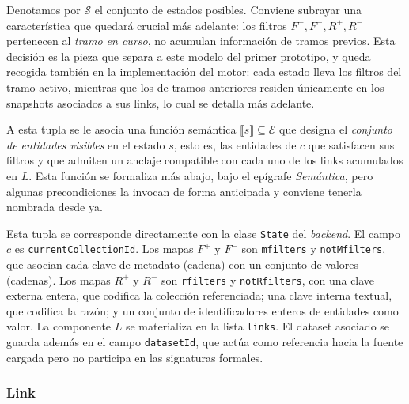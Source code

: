 Denotamos por $\mathcal{S}$ el conjunto de estados posibles. Conviene subrayar una característica que
quedará crucial más adelante: los filtros $F^{+}, F^{-}, R^{+}, R^{-}$ pertenecen al \emph{tramo en curso},
no acumulan información de tramos previos. Esta decisión es la pieza que separa a este modelo del primer
prototipo, y queda recogida también en la implementación del motor: cada estado lleva los filtros del tramo
activo, mientras que los de tramos anteriores residen únicamente en los snapshots asociados a sus links,
lo cual se detalla más adelante.

A esta tupla se le asocia una función semántica $\llbracket s \rrbracket \subseteq \mathcal{E}$ que designa el
\emph{conjunto de entidades visibles} en el estado $s$, esto es, las entidades de $c$ que satisfacen sus
filtros y que admiten un anclaje compatible con cada uno de los links acumulados en $L$. Esta función se
formaliza más abajo, bajo el epígrafe \emph{Semántica}, pero algunas precondiciones la invocan de forma
anticipada y conviene tenerla nombrada desde ya.

Esta tupla se corresponde directamente con la clase \texttt{State} del \textit{backend}. El campo $c$ es
\texttt{currentCollectionId}. Los mapas $F^{+}$ y $F^{-}$ son \texttt{mfilters} y \texttt{notMfilters},
que asocian cada clave de metadato (cadena) con un conjunto de valores (cadenas). Los mapas $R^{+}$ y $R^{-}$
son \texttt{rfilters} y \texttt{notRfilters}, con una clave externa entera, que codifica la colección
referenciada; una clave interna textual, que codifica la razón; y un conjunto de identificadores enteros de
entidades como valor. La componente $L$ se materializa en la lista \texttt{links}. El dataset asociado se
guarda además en el campo \texttt{datasetId}, que actúa como referencia hacia la fuente cargada pero no
participa en las signaturas formales.

\subsubsection*{Link}

